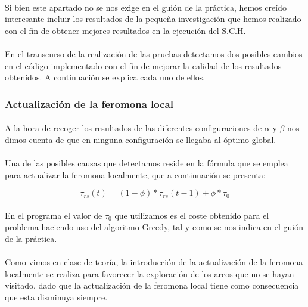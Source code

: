 	\paragraph{}Si bien este apartado no se nos exige en el guión de la práctica, hemos creído interesante incluir los resultados de la pequeña investigación que hemos realizado con el fin de obtener mejores resultados en la ejecución del S.C.H.
	
	\paragraph{}En el transcurso de la realización de las pruebas detectamos dos posibles cambios en el código implementado con el fin de mejorar la calidad de los resultados obtenidos. A continuación se explica cada uno de ellos.
	
	\newpage
	
	\subsubsection{Actualización de la feromona local} 
	
	\paragraph{}A la hora de recoger los resultados de las diferentes configuraciones de $\alpha$ y $\beta$ nos dimos cuenta de que en ninguna configuración se llegaba al óptimo global.
	
	\paragraph{}Una de las posibles causas que detectamos reside en la fórmula que se emplea para actualizar la feromona localmente, que a continuación se presenta:
	
	\begin{equation}
	\tau_{rs}(t) = (1-\phi)*\tau_{rs}(t-1)+\phi*\tau_{0}
	\end{equation}
	
	\paragraph{}En el programa el valor de $\tau_{0}$ que utilizamos es el coste obtenido para el problema haciendo uso del algoritmo Greedy, tal y como se nos indica en el guión de la práctica. 
	
	\paragraph{}Como vimos en clase de teoría, la introducción de la actualización de la feromona localmente se realiza para favorecer la exploración de los arcos que no se hayan visitado, dado que la actualización de la feromona local tiene como consecuencia que esta disminuya siempre.
	
